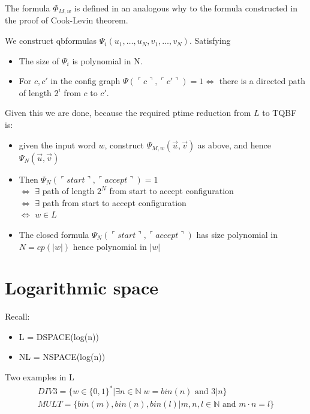 \documentclass[a4paper,12pt]{article}
\theoremstyle{definition}
\theoremstyle{remark}
\newcommand{\N}{\mathbb{N}}
\begin{document}
The formula $\Phi_{M, w}$ is defined in an analogous why to the formula constructed in the proof of Cook-Levin theorem.

We construct qbformulas $\Psi_i (u_1, \dots, u_N, v_1, \dots, v_N)$. Satisfying
\begin{itemize}
    \item The size of $\Psi_i$ is polynomial in N.
    \item For $c, c'$ in the config graph $\Psi(\ulcorner c \urcorner, \ulcorner c'\urcorner) = 1 \iff $ there is a directed path of length $2^i$ from $c$ to $c'$.
\end{itemize}

Given this we are done, because the required ptime reduction from $L$ to TQBF is:
\begin{itemize}
    \item given the input word $w$, construct $\Psi_{M, w} (\vec{u}, \vec{v})$ as above, and hence $\Psi_N(\vec{u}, \vec{v})$
    \item Then $\Psi_N (\ulcorner start \urcorner, \ulcorner accept \urcorner) = 1$ \\
    $\iff$ $\exists$ path of length $2^N$ from start to accept configuration \\
    $\iff$ $\exists$ path from start to accept configuration \\
    $\iff$ $w \in L$
    \item The closed formula $\Psi_N (\ulcorner start \urcorner, \ulcorner accept \urcorner)$ has size polynomial in $N = cp(|w|)$ hence polynomial in $|w|$
\end{itemize}







\newpage
\section{Logarithmic space}
Recall:
\begin{itemize}
    \item L = DSPACE(log(n))
    \item NL = NSPACE(log(n))
\end{itemize}

Two examples in L
\begin{gather*}
    DIV3 = \{w \in \{0, 1\}^* | \exists n \in \N \; w = bin(n) \text{ and } 3|n\} \\
    MULT = \{bin(m), bin(n), bin(l) | m, n, l \in \N \text{ and } m \cdot n = l\}
\end{gather*}
\end{document}
